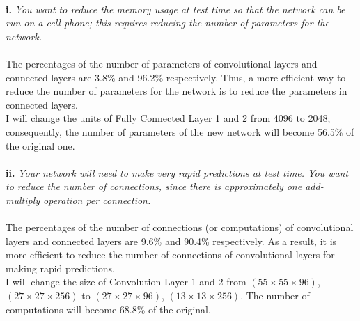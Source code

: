 \documentclass{myhw}
\begin{document}
\begin{homeworkProblem}
\begin{homeworkSection}
\\
\textbf{i.} \emph{You want to reduce the memory usage at test time so that the network can be run on a cell phone; this requires reducing the number of parameters for the network.} \\
\\ %
The percentages of the number of parameters of convolutional layers and connected layers are 3.8\% and 96.2\% respectively. Thus, a more efficient way to reduce the number of parameters for the network is to reduce the parameters in connected layers. \\
I will change the units of Fully Connected Layer 1 and 2 from 4096 to 2048; consequently, the number of parameters of the new network will become 56.5\% of the original one.
\\
\\
\textbf{ii.} \emph{Your network will need to make very rapid predictions at test time. You want to reduce the number of connections, since there is approximately one add-multiply operation per connection.} \\
\\ %
The percentages of the number of connections (or computations) of convolutional layers and connected layers are 9.6\% and 90.4\% respectively. As a result, it is more efficient to reduce the number of connections of convolutional layers for making rapid predictions. \\
I will change the size of Convolution Layer 1 and 2 from $(55\times55\times96)$, $(27\times27\times256)$ to $(27\times27\times96)$, $(13\times13\times256)$. The number of computations will become 68.8\% of the original.
\end{homeworkSection}
\end{homeworkProblem}
\end{document}
